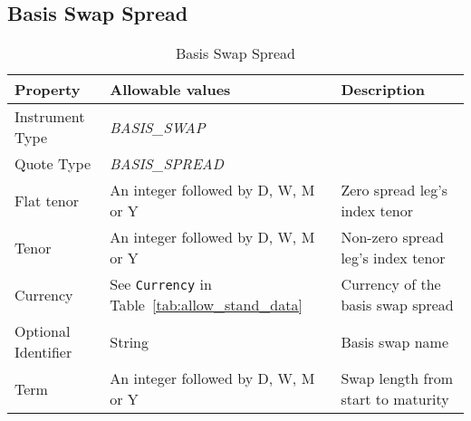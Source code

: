

\subsection{Basis Swap Spread}

\begin{table}[H]
\centering
  \begin{tabular}{|p{3.4cm}|p{3.8cm}|p{6.3cm}|}
    \hline
    {\bf Property} & {\bf Allowable values} & {\bf Description} \\ \hline
    Instrument Type & \emph{BASIS\_SWAP} & \\ \hline
    Quote Type & \emph{BASIS\_SPREAD} & \\ \hline
    Flat tenor & An integer followed by D, W, M or Y & Zero spread leg's index tenor\\ \hline
    Tenor & An integer followed by D, W, M or Y & Non-zero spread leg's index tenor\\ \hline
    Currency & See \lstinline!Currency! in Table~\ref{tab:allow_stand_data}& Currency of the basis swap spread\\ \hline
    Optional Identifier & String & Basis swap name\\ \hline
    Term & An integer followed by D, W, M or Y & Swap length from start to maturity\\ \hline
  \end{tabular}
  \caption{Basis Swap Spread}
  \label{tab:basisspread_quote}
\end{table}


